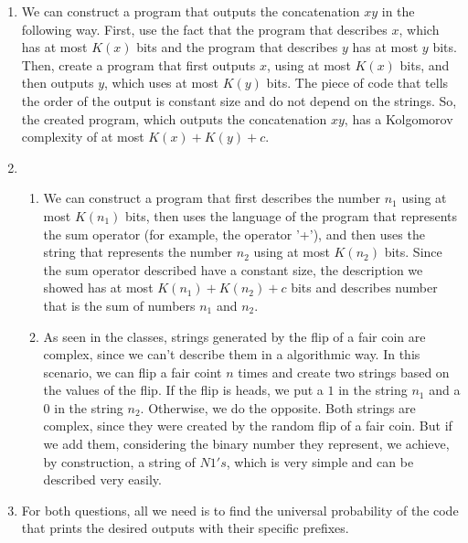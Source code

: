 \documentclass{article}
\begin{document}
\begin{enumerate}
	\item We can construct a program that outputs the concatenation \(xy\) in the following way. First, use the fact that the program that describes \(x\),
	      which has at most \(K(x)\) bits and the program that describes \(y\) has at most \(y\) bits. Then, create a program that first outputs \(x\), using at most \(K(x)\) bits, and then outputs \(y\), which uses at most \(K(y)\) bits.
	      The piece of code that tells the order of the output is constant size and do not depend on the strings. So, the created program, which outputs the concatenation \(xy\), has a Kolgomorov complexity of at most \(K(x) + K(y) + c\).
	\item \begin{enumerate}
		      \item We can construct a program that first describes the number \(n_1\) using at most \(K(n_1)\) bits, then uses the language of the program that represents the sum operator (for example, the operator '+'), and then
		            uses the string that represents the number \(n_2\) using at most \(K(n_2)\) bits. Since the sum operator described have a constant size, the description we showed has at most \(K(n_1) + K(n_2) + c\) bits and describes number
		            that is the sum of numbers \(n_1\) and \(n_2\).
		      \item As seen in the classes, strings generated by the flip of a fair coin are complex, since we can't describe them in a algorithmic way. In this scenario, we can flip a fair coint \(n\) times and create two strings based
		            on the values of the flip. If the flip is heads, we put a \(1\) in the string \(n_1\) and a \(0\) in the string \(n_2\). Otherwise, we do the opposite. Both strings are complex, since they were created by the random flip of a fair coin. But if we add them, considering the binary number they represent, we achieve, by construction,
		            a string of \(N 1's\), which is very simple and can be described very easily.
	      \end{enumerate}
	\item For both questions, all we need is to find the universal probability of the code that prints the desired outputs with their specific prefixes.


\end{enumerate}
\end{document}
